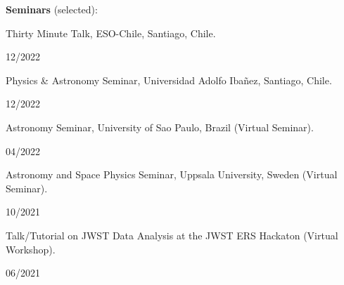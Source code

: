 \documentclass[12pt, a4paper]{article} %
\begin{document}
\textbf{Seminars} (selected):\\

\begin{minipage}[t]{0.7\textwidth}
\begin{flushleft}%
  \setlength{\leftskip}{0.2cm}%
Thirty Minute Talk, ESO-Chile, Santiago, Chile.
\end{flushleft}
\end{minipage}
\begin{minipage}[t]{0.3\textwidth}
\hfill 12/2022
\end{minipage}
\vspace{0.2cm}

\begin{minipage}[t]{0.7\textwidth}
\begin{flushleft}%
  \setlength{\leftskip}{0.2cm}%
Physics \& Astronomy Seminar, Universidad Adolfo Iba\~nez, Santiago, Chile.
\end{flushleft}
\end{minipage}
\begin{minipage}[t]{0.3\textwidth}
\hfill 12/2022
\end{minipage}
\vspace{0.2cm}

\begin{minipage}[t]{0.7\textwidth}
\begin{flushleft}%
  \setlength{\leftskip}{0.2cm}%
Astronomy Seminar, University of Sao Paulo, Brazil (Virtual Seminar).
\end{flushleft}
\end{minipage}
\begin{minipage}[t]{0.3\textwidth}
\hfill 04/2022
\end{minipage}
\vspace{0.2cm}

\begin{minipage}[t]{0.7\textwidth}
\begin{flushleft}%
  \setlength{\leftskip}{0.2cm}%
Astronomy and Space Physics Seminar, Uppsala University, Sweden (Virtual Seminar).
\end{flushleft}
\end{minipage}
\begin{minipage}[t]{0.3\textwidth}
\hfill 10/2021
\end{minipage}
\vspace{0.2cm}

\begin{minipage}[t]{0.7\textwidth}
\begin{flushleft}%
  \setlength{\leftskip}{0.2cm}%
Talk/Tutorial on JWST Data Analysis at the JWST ERS Hackaton (Virtual Workshop).
\end{flushleft}
\end{minipage}
\begin{minipage}[t]{0.3\textwidth}
\hfill 06/2021
\end{minipage}
\vspace{0.2cm}
\end{document}
